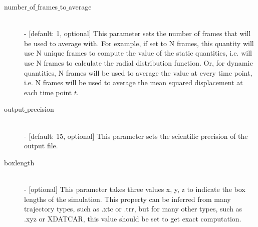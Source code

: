 \documentclass{article}
\begin{document}
\begin{description}
	\item[number$\_$of$\_$frames$\_$to$\_$average] \hfill \\
	- [default: 1, optional] This parameter sets the number of frames that will be used to average with.  For example, if set to N frames, this quantity will use N unique frames to compute the value of the static quantities, i.e. will use N frames to calculate the radial distribution function.  Or, for dynamic quantities, N frames will be used to average the value at every time point, i.e. N frames will be used to average the mean squared displacement at each time point $t$.
	
	\item[output$\_$precision] \hfill \\
	- [default: 15, optional] This parameter sets the scientific precision of the output file.
	
	\item[boxlength] \hfill \\
	- [optional] This parameter takes three values x, y, z to indicate the box lengths of the simulation. This property can be inferred from many trajectory types, such as .xtc or .trr, but for many other types, such as .xyz or XDATCAR, this value should be set to get exact computation.
	
	
\end{description}
\end{document}
